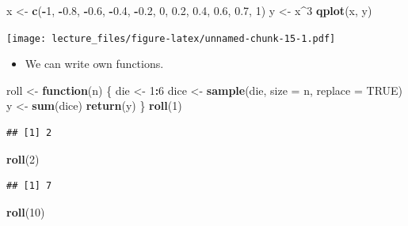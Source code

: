 \documentclass[]{book}
\newenvironment{Shaded}{\begin{snugshade}}{\end{snugshade}}
\newcommand{\KeywordTok}[1]{\textcolor[rgb]{0.13,0.29,0.53}{\textbf{#1}}}
\newcommand{\DataTypeTok}[1]{\textcolor[rgb]{0.13,0.29,0.53}{#1}}
\newcommand{\DecValTok}[1]{\textcolor[rgb]{0.00,0.00,0.81}{#1}}
\newcommand{\FloatTok}[1]{\textcolor[rgb]{0.00,0.00,0.81}{#1}}
\newcommand{\StringTok}[1]{\textcolor[rgb]{0.31,0.60,0.02}{#1}}
\newcommand{\OtherTok}[1]{\textcolor[rgb]{0.56,0.35,0.01}{#1}}
\newcommand{\ControlFlowTok}[1]{\textcolor[rgb]{0.13,0.29,0.53}{\textbf{#1}}}
\newcommand{\OperatorTok}[1]{\textcolor[rgb]{0.81,0.36,0.00}{\textbf{#1}}}
\newcommand{\NormalTok}[1]{#1}
\providecommand{\tightlist}{%
  \setlength{\itemsep}{0pt}\setlength{\parskip}{0pt}}
\theoremstyle{definition}
\theoremstyle{definition}
\theoremstyle{definition}
\theoremstyle{remark}
\begin{document}
\begin{Shaded}
\begin{Highlighting}[]
\NormalTok{x <-}\StringTok{ }\KeywordTok{c}\NormalTok{(}\OperatorTok{-}\DecValTok{1}\NormalTok{, }\OperatorTok{-}\FloatTok{0.8}\NormalTok{, }\OperatorTok{-}\FloatTok{0.6}\NormalTok{, }\OperatorTok{-}\FloatTok{0.4}\NormalTok{, }\OperatorTok{-}\FloatTok{0.2}\NormalTok{, }\DecValTok{0}\NormalTok{, }\FloatTok{0.2}\NormalTok{, }\FloatTok{0.4}\NormalTok{, }\FloatTok{0.6}\NormalTok{, }\FloatTok{0.7}\NormalTok{, }\DecValTok{1}\NormalTok{)}
\NormalTok{y <-}\StringTok{ }\NormalTok{x}\OperatorTok{^}\DecValTok{3}
\KeywordTok{qplot}\NormalTok{(x, y)}
\end{Highlighting}
\end{Shaded}

\texttt{[image: lecture\_files/figure-latex/unnamed-chunk-15-1.pdf]}

\begin{itemize}
\tightlist
\item
  We can write own functions.
\end{itemize}

\begin{Shaded}
\begin{Highlighting}[]
\NormalTok{roll <-}\StringTok{ }\ControlFlowTok{function}\NormalTok{(n) \{}
\NormalTok{  die <-}\StringTok{ }\DecValTok{1}\OperatorTok{:}\DecValTok{6}
\NormalTok{  dice <-}\StringTok{ }\KeywordTok{sample}\NormalTok{(die, }\DataTypeTok{size =}\NormalTok{ n, }\DataTypeTok{replace =} \OtherTok{TRUE}\NormalTok{)}
\NormalTok{  y <-}\StringTok{ }\KeywordTok{sum}\NormalTok{(dice)}
  \KeywordTok{return}\NormalTok{(y)}
\NormalTok{\}}
\KeywordTok{roll}\NormalTok{(}\DecValTok{1}\NormalTok{)}
\end{Highlighting}
\end{Shaded}

\begin{verbatim}
## [1] 2
\end{verbatim}

\begin{Shaded}
\begin{Highlighting}[]
\KeywordTok{roll}\NormalTok{(}\DecValTok{2}\NormalTok{)}
\end{Highlighting}
\end{Shaded}

\begin{verbatim}
## [1] 7
\end{verbatim}

\begin{Shaded}
\begin{Highlighting}[]
\KeywordTok{roll}\NormalTok{(}\DecValTok{10}\NormalTok{)}
\end{Highlighting}
\end{Shaded}
\end{document}
